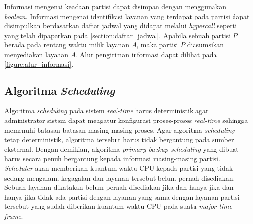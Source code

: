 Informasi mengenai keadaan partisi dapat disimpan dengan menggunakan \textit{boolean}. Informasi
mengenai identifikasi layanan yang terdapat pada partisi dapat disimpulkan berdasarkan daftar
jadwal yang didapat melalui \textit{hypercall} seperti yang telah dipaparkan pada
\autoref{section:daftar_jadwal}. Apabila sebuah partisi $P$ berada pada rentang waktu milik
layanan $A$, maka partisi $P$ diasumsikan menyediakan layanan $A$. Alur pengiriman informasi
dapat dilihat pada \autoref{figure:alur_informasi}.

\subsection{Algoritma \textit{Scheduling}}
\label{section:algoritma_scheduling}

Algoritma \textit{scheduling} pada sistem \textit{real-time} harus deterministik agar
administrator sistem dapat mengatur konfigurasi proses-proses \textit{real-time} sehingga
memenuhi batasan-batasan masing-masing proses. Agar algoritma \textit{scheduling} tetap
deterministik, algoritma tersebut harus tidak bergantung pada sumber eksternal. Dengan demikian,
algoritma \textit{primary-backup scheduling} yang dibuat harus secara penuh bergantung kepada
informasi masing-masing partisi. \textit{Scheduler} akan memberikan kuantum waktu CPU kepada partisi
yang tidak sedang mengalami kegagalan dan layanan tersebut belum pernah
disediakan. Sebuah layanan dikatakan belum pernah disediakan jika dan hanya jika dan
hanya jika tidak ada partisi dengan layanan yang sama dengan layanan partisi
tersebut yang sudah diberikan kuantum waktu CPU pada suatu \textit{major time frame}.

